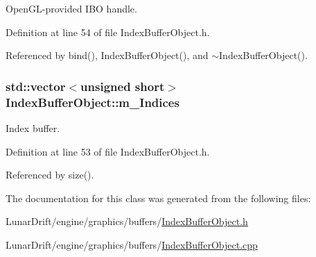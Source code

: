 Open\+G\+L-\/provided I\+BO handle. 



Definition at line 54 of file Index\+Buffer\+Object.\+h.



Referenced by bind(), Index\+Buffer\+Object(), and $\sim$\+Index\+Buffer\+Object().

\subsubsection[{\texorpdfstring{m\+\_\+\+Indices}{m_Indices}}]{\setlength{\rightskip}{0pt plus 5cm}std\+::vector$<$unsigned short$>$ Index\+Buffer\+Object\+::m\+\_\+\+Indices\hspace{0.3cm}{\ttfamily [private]}}\hypertarget{class_index_buffer_object_a990bafed8ff20200858ce93a833019af}{}\label{class_index_buffer_object_a990bafed8ff20200858ce93a833019af}


Index buffer. 



Definition at line 53 of file Index\+Buffer\+Object.\+h.



Referenced by size().



The documentation for this class was generated from the following files\+:\begin{DoxyCompactItemize}
\item 
Lunar\+Drift/engine/graphics/buffers/\hyperlink{_index_buffer_object_8h}{Index\+Buffer\+Object.\+h}\item 
Lunar\+Drift/engine/graphics/buffers/\hyperlink{_index_buffer_object_8cpp}{Index\+Buffer\+Object.\+cpp}\end{DoxyCompactItemize}
